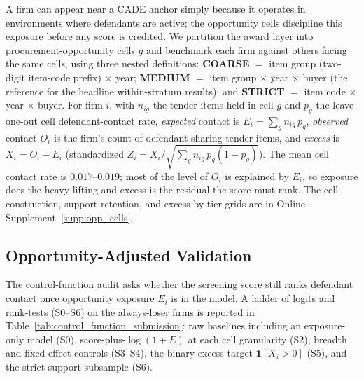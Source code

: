 A firm can appear near a CADE anchor simply because it operates in
environments where defendants are active; the opportunity cells
discipline this exposure before any score is credited. We partition the
award layer into procurement-opportunity cells $g$ and benchmark each
firm against others facing the same cells, using three nested
definitions: \textbf{COARSE} $=$ item group (two-digit item-code prefix)
$\times$ year; \textbf{MEDIUM} $=$ item group $\times$ year $\times$
buyer (the reference for the headline within-stratum results); and
\textbf{STRICT} $=$ item code $\times$ year $\times$ buyer. For firm $i$,
with $n_{ig}$ the tender-items held in cell $g$ and $p_g$ the
leave-one-out cell defendant-contact rate, \emph{expected} contact is
$E_i = \sum_g n_{ig}\, p_g$, \emph{observed} contact $O_i$ is the firm's
count of defendant-sharing tender-items, and \emph{excess} is
$X_i = O_i - E_i$ (standardized $Z_i = X_i/\sqrt{\sum_g n_{ig}\,
p_g(1-p_g)}$). The mean cell contact rate is $0.017$--$0.019$; most of the
level of $O_i$ is explained by $E_i$, so exposure does the heavy lifting
and excess is the residual the score must rank. The cell-construction,
support-retention, and excess-by-tier grids are in Online
Supplement~\ref{supp:opp_cells}.

\subsection{Opportunity-Adjusted Validation}
\label{app:control_function_submission}

The control-function audit asks whether the screening score still ranks
defendant contact once opportunity exposure $E_i$ is in the model. A
ladder of logits and rank-tests (S0--S6) on the always-loser firms is
reported in Table~\ref{tab:control_function_submission}: raw baselines
including an exposure-only model (S0), score-plus-$\log(1{+}E)$ at each
cell granularity (S2), breadth and fixed-effect controls (S3--S4), the
binary excess target $\mathbf{1}[X_i>0]$ (S5), and the strict-support
subsample (S6).

